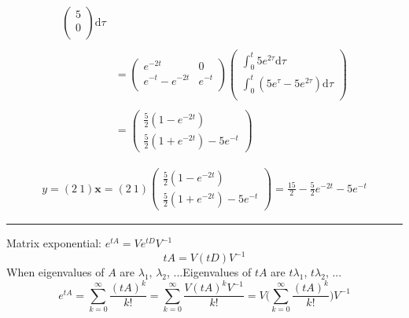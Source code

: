 \begin{ex}{}
\begin{equation*}
\begin{aligned}
\begin{pmatrix}
5\\
0\\
\end{pmatrix}\mathrm{d}\tau\\\\
&=\begin{pmatrix}
e^{-2t} & 0\\
e^{-t}-e^{-2t} & e^{-t}\\
\end{pmatrix}
\begin{pmatrix}
\int_{0}^{t} 5e^{2\tau}\mathrm{d}\tau\\
\int_{0}^{t} (5e^{\tau}-5e^{2\tau})\mathrm{d}\tau\\
\end{pmatrix}\\\\
&=\begin{pmatrix}
\frac{5}{2}(1-e^{-2t})\\
\frac{5}{2}(1+e^{-2t})-5e^{-t}
\end{pmatrix}
\end{aligned}
\end{equation*}

\begin{gather*}
y = (2 \ 1)\mathbf{x} = (2 \ 1)\begin{pmatrix}
\frac{5}{2}(1-e^{-2t})\\
\frac{5}{2}(1+e^{-2t})-5e^{-t}
\end{pmatrix}
 = \frac{15}{2}-\frac{5}{2}e^{-2t}-5e^{-t}
\end{gather*}

\vspace{.3cm}\hrule\vspace{.3cm}
Matrix exponential: $e^{tA} = Ve^{tD}V^{-1}$
\[tA = V(tD)V^{-1}\]
When eigenvalues of $A$ are $\lambda_{1}$, $\lambda_{2}$, ...Eigenvalues of $tA$ are $t\lambda_{1}$, $t\lambda_{2}$, ...
\[e^{tA} = \sum^{\infty}_{k=0}\frac{(tA)^{k}}{k!} =\sum^{\infty}_{k=0}\frac{V(tA)^{k}V^{-1}}{k!} = V\bigg(\sum^{\infty}_{k=0}\frac{(tA)^{k}}{k!}\bigg)V^{-1} \]


\end{ex}
